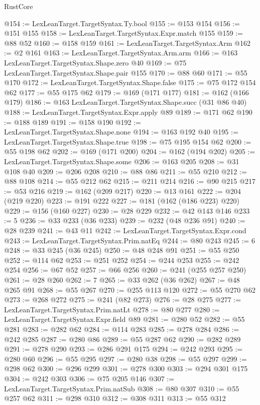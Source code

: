 \begin{lexlean}{RustCore}
\begin{coremodule}
@154 := LexLeanTarget.TargetSyntax.Ty.bool
@155 := @153 @154
@156 := @151 @155
@158 := LexLeanTarget.TargetSyntax.Expr.match @155
@159 := @88 @52
@160 := @158 @159
@161 := LexLeanTarget.TargetSyntax.Arm
@162 := @2 @161
@163 := LexLeanTarget.TargetSyntax.Arm.arm
@166 := @163 LexLeanTarget.TargetSyntax.Shape.zero @40
@169 := @75 LexLeanTarget.TargetSyntax.Shape.pair @155
@170 := @88 @60
@171 := @55 @170
@172 := LexLeanTarget.TargetSyntax.Shape.false
@175 := @75 @172 @154 @62
@177 := @55 @175 @62
@179 := @169 (@171 @177)
@181 := @162 (@166 @179)
@186 := @163 LexLeanTarget.TargetSyntax.Shape.succ (@31 @86 @40)
@188 := LexLeanTarget.TargetSyntax.Expr.apply @89
@189 := @171 @62
@190 := @188 @189
@191 := @158 @190
@192 := LexLeanTarget.TargetSyntax.Shape.none
@194 := @163 @192 @40
@195 := LexLeanTarget.TargetSyntax.Shape.true
@198 := @75 @195 @154 @62
@200 := @55 @198 @62
@202 := @169 (@171 @200)
@204 := @162 (@194 @202)
@205 := LexLeanTarget.TargetSyntax.Shape.some
@206 := @163 @205
@208 := @31 @108 @40
@209 := @206 @208
@210 := @88 @86
@211 := @55 @210
@212 := @88 @108
@214 := @55 @212 @62
@215 := @211 @214
@216 := @90 @215
@217 := @53 @216
@219 := @162 (@209 @217)
@220 := @13 @161
@222 := @204 (@219 @220)
@223 := @191 @222
@227 := @181 (@162 (@186 @223) @220)
@229 := @156 (@160 @227)
@230 := @28 @229
@232 := @42 @143 @146
@233 := 5
@236 := @33 @233 (@36 @233)
@239 := @232 (@48 @236 @91)
@240 := @28 @239
@241 := @43 @11
@242 := LexLeanTarget.TargetSyntax.Expr.cond
@243 := LexLeanTarget.TargetSyntax.Prim.natEq
@244 := @80 @243
@245 := 6
@248 := @33 @245 (@36 @245)
@250 := @48 @248 @91
@251 := @55 @250
@252 := @114 @62
@253 := @251 @252
@254 := @244 @253
@255 := @242 @254
@256 := @67 @52
@257 := @66 @256
@260 := @241 (@255 @257 @250)
@261 := @28 @260
@262 := 7
@265 := @33 @262 (@36 @262)
@267 := @48 @265 @91
@268 := @55 @267
@270 := @255 @113 @120
@272 := @55 @270 @62
@273 := @268 @272
@275 := @241 (@82 @273)
@276 := @28 @275
@277 := LexLeanTarget.TargetSyntax.Prim.natLt
@278 := @80 @277
@280 := LexLeanTarget.TargetSyntax.Expr.field @89
@281 := @280 @52
@282 := @55 @281
@283 := @282 @62
@284 := @114 @283
@285 := @278 @284
@286 := @242 @285
@287 := @280 @86
@289 := @55 @287 @62
@290 := @282 @289
@291 := @278 @290
@293 := @286 @291 @175
@294 := @242 @293
@295 := @280 @60
@296 := @55 @295
@297 := @280 @38
@298 := @55 @297
@299 := @298 @62
@300 := @296 @299
@301 := @278 @300
@303 := @294 @301 @175
@304 := @242 @303
@306 := @75 @205 @146
@307 := LexLeanTarget.TargetSyntax.Prim.natSub
@308 := @80 @307
@310 := @55 @257 @62
@311 := @298 @310
@312 := @308 @311
@313 := @55 @312

\end{coremodule}
\end{lexlean}

